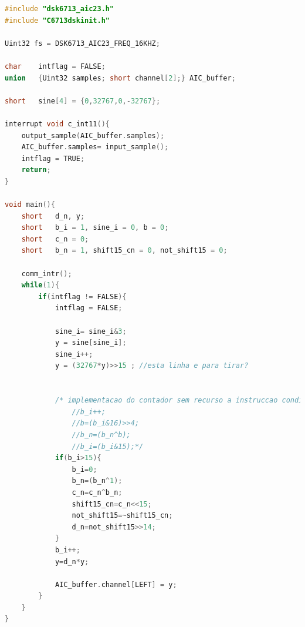 \documentclass[11pt]{article}
\numberwithin{equation}{section}
\begin{document}
\begin{lstlisting}[language=C]
#include "dsk6713_aic23.h"	
#include "C6713dskinit.h"

Uint32 fs = DSK6713_AIC23_FREQ_16KHZ;	

char	intflag = FALSE;
union	{Uint32 samples; short channel[2];} AIC_buffer;

short	sine[4] = {0,32767,0,-32767};

interrupt void c_int11(){
	output_sample(AIC_buffer.samples);   	
	AIC_buffer.samples= input_sample(); 	    
	intflag = TRUE;
	return;
}

void main(){
	short	d_n, y;
	short	b_i = 1, sine_i = 0, b = 0;
	short	c_n = 0;
	short	b_n = 1, shift15_cn = 0, not_shift15 = 0;
	
	comm_intr();
	while(1){
		if(intflag != FALSE){
			intflag = FALSE;
			
			sine_i= sine_i&3;
			y = sine[sine_i];
			sine_i++;
			y = (32767*y)>>15 ; //esta linha e para tirar?
			
			
			/* implementacao do contador sem recurso a instruccao condicional if */
				//b_i++;
				//b=(b_i&16)>>4;
				//b_n=(b_n^b);
				//b_i=(b_i&15);*/
			if(b_i>15){
				b_i=0;
				b_n=(b_n^1);
				c_n=c_n^b_n;
				shift15_cn=c_n<<15;
				not_shift15=~shift15_cn;
				d_n=not_shift15>>14;				
			}
			b_i++;
			y=d_n*y;
			
			AIC_buffer.channel[LEFT] = y;
		}
	}
}
\end{lstlisting}
\end{document}
